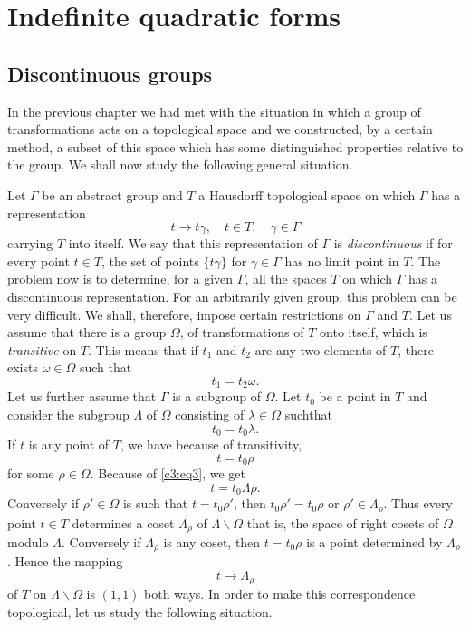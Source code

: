 \chapter{Indefinite quadratic forms}\label{chap3}

\section{Discontinuous groups}\label{chap3:sec1}\pageoriginale

In the previous chapter we had met with the situation in which a group
of transformations acts on a topological space and we constructed, by
a certain method, a subset of this space which has some distinguished
properties relative to the group. We shall now study the following
general situation.

Let $\Gamma$ be an abstract group and $T$ a Hausdorff topological
space on which $\Gamma$ has a representation
\begin{equation*}
t\to t\gamma,\quad t\in T,\quad \gamma\in\Gamma\tag{1}\label{c3:eq1}
\end{equation*}
carrying $T$ into itself. We say that this representation of $\Gamma$
is {\em discontinuous} if for every point $t\in T$, the set of points
$\{t\gamma\}$ for $\gamma\in\Gamma$ has no limit point in $T$. The
problem now is to determine, for a given $\Gamma$, all the spaces $T$
on which $\Gamma$ has a discontinuous representation. For an
arbitrarily given group, this problem can be very difficult. We shall,
therefore, impose certain restrictions on $\Gamma$ and $T$. Let us
assume that there is a group $\Omega$, of transformations of $T$ onto
itself, which is {\em transitive} on $T$. This means that if $t_{1}$
and $t_{2}$ are any two elements of $T$, there exists
$\omega\in\Omega$ such that
\begin{equation*}
t_{1}=t_{2}\omega.\tag{2}\label{c3:eq2}
\end{equation*}
Let us further assume that $\Gamma$ is a subgroup of $\Omega$. Let
$t_{0}$ be a point in $T$ and consider the subgroup $\Lambda$ of
$\Omega$ consisting of $\lambda \in\Omega$ such\pageoriginale that
\begin{equation*}
t_{0}=t_{0}\lambda.\tag{3}\label{c3:eq3}
\end{equation*}
If $t$ is any point of $T$, we have because of transitivity,
$$
t=t_{0}\rho
$$
for some $\rho\in\Omega$. Because of \eqref{c3:eq3}, we get
$$
t=t_{0}\Lambda\rho.
$$
Conversely if $\rho'\in\Omega$ is  such that
$t=t_{0}\rho'$, then $t_{0}\rho'=t_{0}\rho$ or
$\rho'\in\Lambda_{\rho}$. Thus every point $t\in T$ determines a coset
$\Lambda_{\rho}$ of $\Lambda\backslash \Omega$ that is, the space of
right cosets of $\Omega$ modulo $\Lambda$. Conversely if
$\Lambda_{\rho}$ is any coset, then $t=t_{0}\rho$ is a point
determined by $\Lambda_{\rho}$. Hence the mapping
\begin{equation*}
t\to \Lambda_{\rho}\tag{4}\label{c3:eq4}
\end{equation*}
of $T$ on $\Lambda\backslash \Omega$ is $(1,1)$ both ways. In order to
make this correspondence topological, let us study the following
situation.

